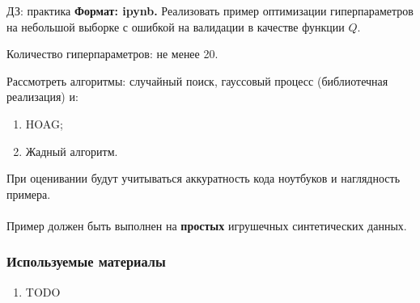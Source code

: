 \documentclass[10pt,pdf,utf8,russian,aspectratio=169]{beamer}
\begin{document}
\begin{frame}{ДЗ: практика}
\textbf{Формат: ipynb.}
Реализовать пример оптимизации гиперпараметров на небольшой выборке с ошибкой на валидации в качестве функции $Q$.

Количество гиперпараметров: не менее 20.

Рассмотреть алгоритмы: случайный поиск, гауссовый процесс (библиотечная реализация) и:
\begin{enumerate}
\item HOAG;

\item Жадный алгоритм.

\end{enumerate}

При оценивании будут учитываться аккуратность кода ноутбуков и наглядность примера.\\~\\
Пример должен быть выполнен на  \textbf{простых} игрушечных синтетических данных.
\end{frame}


\begin{frame}
\frametitle{Используемые материалы}
\begin{enumerate}
\item TODO
\end{enumerate}
\end{frame}
\end{document}

